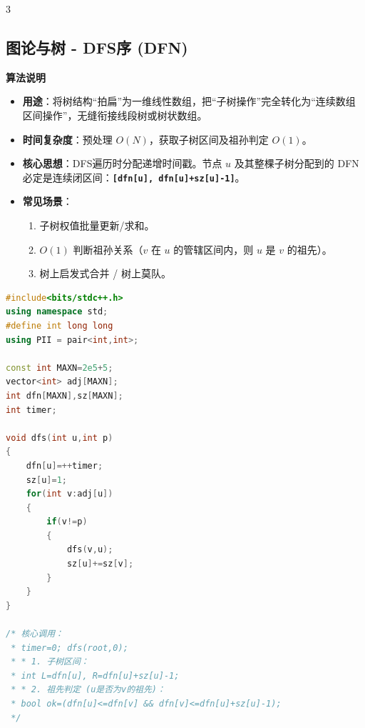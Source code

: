 \documentclass[10pt,landscape,a4paper]{article}
\begin{document}
\begin{multicols*}{3}
\subsection*{图论与树 - DFS序 (DFN)}
\par\addvspace{0.7ex}\noindent\textbf{算法说明}\par\nobreak
\begin{itemize}
\item \textbf{用途}：将树结构“拍扁”为一维线性数组，把“子树操作”完全转化为“连续数组区间操作”，无缝衔接线段树或树状数组。
\item \textbf{时间复杂度}：预处理 $O(N)$，获取子树区间及祖孙判定 $O(1)$。
\item \textbf{核心思想}：DFS遍历时分配递增时间戳。节点 $u$ 及其整棵子树分配到的 DFN 必定是连续闭区间：\textbf{\texttt{[\allowbreak{}d\allowbreak{}f\allowbreak{}n\allowbreak{}[\allowbreak{}u\allowbreak{}]\allowbreak{},\allowbreak{} \allowbreak{}d\allowbreak{}f\allowbreak{}n\allowbreak{}[\allowbreak{}u\allowbreak{}]\allowbreak{}+\allowbreak{}s\allowbreak{}z\allowbreak{}[\allowbreak{}u\allowbreak{}]\allowbreak{}-\allowbreak{}1\allowbreak{}]}}。
\item \textbf{常见场景}：
\begin{enumerate}[start=1]
\item 子树权值批量更新/求和。
\item $O(1)$ 判断祖孙关系（$v$ 在 $u$ 的管辖区间内，则 $u$ 是 $v$ 的祖先）。
\item 树上启发式合并 / 树上莫队。
\end{enumerate}
\end{itemize}
\par{}\par
\begin{lstlisting}[language=C++]
#include<bits/stdc++.h>
using namespace std;
#define int long long
using PII = pair<int,int>;

const int MAXN=2e5+5;
vector<int> adj[MAXN];
int dfn[MAXN],sz[MAXN];
int timer;

void dfs(int u,int p)
{
    dfn[u]=++timer;
    sz[u]=1;
    for(int v:adj[u])
    {
        if(v!=p)
        {
            dfs(v,u);
            sz[u]+=sz[v];
        }
    }
}

/* 核心调用：
 * timer=0; dfs(root,0);
 * * 1. 子树区间：
 * int L=dfn[u], R=dfn[u]+sz[u]-1;
 * * 2. 祖先判定 (u是否为v的祖先)：
 * bool ok=(dfn[u]<=dfn[v] && dfn[v]<=dfn[u]+sz[u]-1);
 */
\end{lstlisting}

\end{multicols*}
\end{document}
